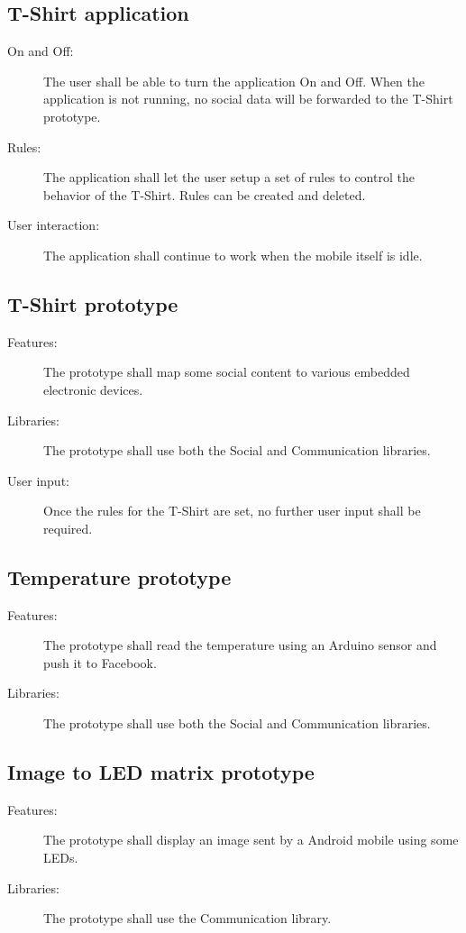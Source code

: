 	\subsection{T-Shirt application}
	
	\begin{description}
	\item[On and Off:] The user shall be able to turn the application On and Off.
	When the application is not running, no social data will be forwarded
	to the T-Shirt prototype.
	\item[Rules:] The application shall let the user setup a set of rules
	to control the behavior of the T-Shirt. Rules can be created and deleted.
	\item[User interaction:] The application shall continue to work
	when the mobile itself is idle.
	\end{description}

	\newpage

	\subsection{T-Shirt prototype}

	\begin{description}
		\item[Features:] The prototype shall map some social content
		to various embedded electronic devices.
		\item[Libraries:] The prototype shall use both the Social and
		Communication libraries.
		\item[User input:] Once the rules for the T-Shirt are set,
		no further user input shall be required.
	\end{description}

	\subsection{Temperature prototype}
	\begin{description}
		\item[Features:] The prototype shall read the temperature
		using an Arduino sensor and push it to Facebook.
		\item[Libraries:] The prototype shall use both the Social and
		Communication libraries.
		\item[]
	\end{description}
	
	\subsection{Image to LED matrix prototype}
	\begin{description}
		\item[Features:] The prototype shall display an image sent by a Android
		mobile using some LEDs.
		\item[Libraries:] The prototype shall use the Communication library.
		\item[]
	\end{description}

